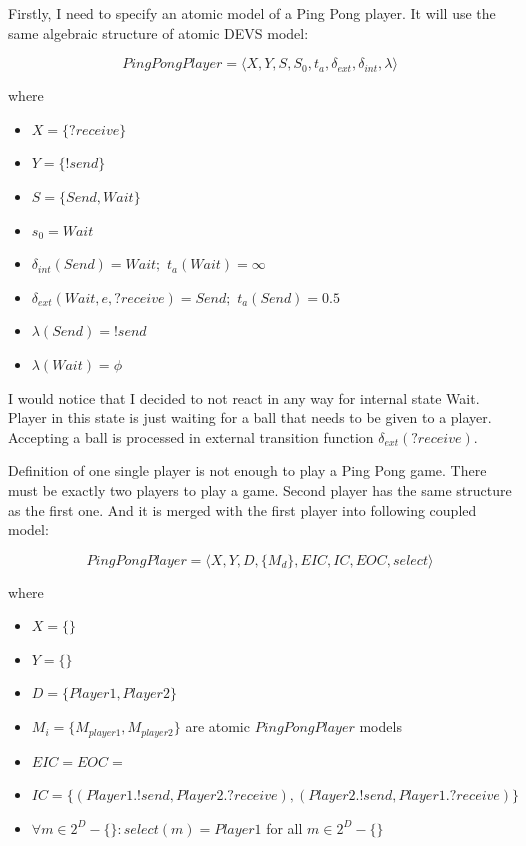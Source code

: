 \documentclass[fleqn,10pt]{olplainarticle}
\begin{document}
Firstly, I need to specify an atomic model of a Ping Pong player. It will use the same algebraic structure of atomic DEVS model:

$$PingPongPlayer = \langle X, Y, S, S_0, t_a, \delta_{ext}, \delta_{int}, \lambda \rangle$$

\noindent where

\begin{itemize}
    \item $X=\{?receive\}$
    \item $Y=\{!send\}$
    \item $S=\{Send, Wait\}$
    \item $s_0=Wait$
    \item $\delta_{int}(Send)=Wait;$ $t_a(Wait)=\infty$
    \item $\delta_{ext}(Wait, e, ?receive)=Send;$ $t_a(Send)=0.5$
    \item $\lambda(Send)=!send$
    \item $\lambda(Wait)=\phi$
\end{itemize}


\noindent I would notice that I decided to not react in any way for internal state {Wait}. Player in this state is just waiting for a ball that needs to be given to a player. Accepting a ball is processed in external transition function $\delta_{ext}(?receive)$.

\pagebreak

\noindent Definition of one single player is not enough to play a Ping Pong game. There must be exactly two players to play a game. Second player has the same structure as the first one. And it is merged with the first player into following coupled model:

$$PingPongPlayer = \langle X, Y, D, \{M_d\}, EIC, IC, EOC, select \rangle$$

\noindent where

\begin{itemize}
    \item $X=\{\}$
    \item $Y=\{\}$
    \item $D=\{Player1, Player2\}$
    \item $M_i=\{M_{player1},M_{player2}\}$ are atomic $PingPongPlayer$ models
    \item $EIC=EOC={}$
    \item $IC=\{(Player1.!send,Player2.?receive),(Player2.!send,Player1.?receive)\}$
    \item $\forall m \in 2^D-\{\} : select(m)=Player1$ for all $m \in 2^D-\{\}$
\end{itemize}
\end{document}
